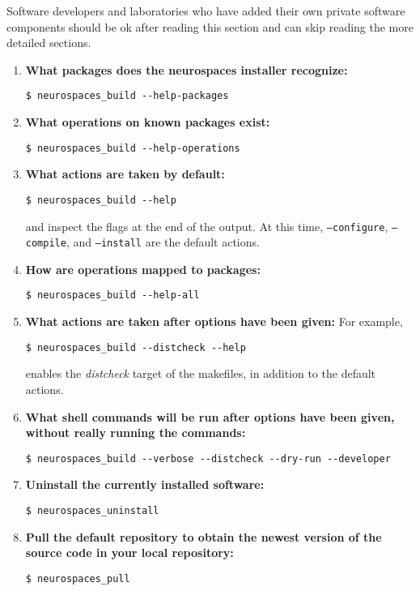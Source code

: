 \documentclass[12pt]{article}
\begin{document}
Software developers and laboratories who have added their own private
software components should be ok after reading this section and can
skip reading the more detailed sections.

\begin{enumerate}
\item {\bf What packages does the neurospaces installer recognize:}
\begin{verbatim}
$ neurospaces_build --help-packages
\end{verbatim}

\item {\bf What operations on known packages exist:}
\begin{verbatim}
$ neurospaces_build --help-operations
\end{verbatim}

\item {\bf What actions are taken by default:}
\begin{verbatim}
$ neurospaces_build --help
\end{verbatim}
and inspect the flags at the end of the output. At this time, {\tt --configure}, {\tt --compile}, and {\tt --install} are the default actions. 

\item {\bf How are operations mapped to packages:}
\begin{verbatim}
$ neurospaces_build --help-all
\end{verbatim}

\item {\bf What actions are taken after options have been given:} For example,
\begin{verbatim}
$ neurospaces_build --distcheck --help
\end{verbatim}
enables the {\it distcheck} target of the makefiles, in addition to the default actions. 

\item {\bf What shell commands will be run after options have been given, without really running the commands:}
\begin{verbatim}
$ neurospaces_build --verbose --distcheck --dry-run --developer
\end{verbatim}

\item {\bf Uninstall the currently installed software:}
\begin{verbatim}
$ neurospaces_uninstall
\end{verbatim}

\item {\bf Pull the default repository to obtain the newest version of the
  source code in your local repository:}
\begin{verbatim}
$ neurospaces_pull
\end{verbatim}


\end{enumerate}
\end{document}
